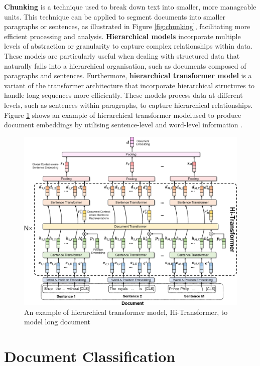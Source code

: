 \textbf{Chunking} is a technique used to break down text into smaller, more manageable units. This technique can be applied to segment documents into smaller paragraphs or sentences, as illustrated in Figure \ref{fig:chunking}, facilitating more efficient processing and analysis. \textbf{Hierarchical models} incorporate multiple levels of abstraction or granularity to capture complex relationships within data. These models are particularly useful when dealing with structured data that naturally falls into a hierarchical organisation, such as documents composed of paragraphs and sentences. Furthermore, \textbf{hierarchical transformer model} is a variant of the transformer architecture that incorporate hierarchical structures to handle long sequences more efficiently. These models process data at different levels, such as sentences within paragraphs, to capture hierarchical relationships. Figure \ref{fig:hi_transformer} shows an example of hierarchical transformer modelused to produce document embeddings by utilising sentence-level and word-level information \cite{wu-2021-hi-transformer}.

\begin{figure}[htbp]
    \centering
    \includegraphics[width=0.9\linewidth]{images/hi_transformer.png}
    \caption{An example of hierarchical transformer model, Hi-Transformer\cite{wu-2021-hi-transformer}, to model long document}
    \label{fig:hi_transformer}
\end{figure}

\section{Document Classification}

